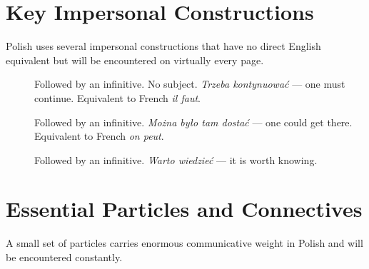 
\section{Key Impersonal Constructions}

Polish uses several impersonal constructions that have no direct English 
equivalent but will be encountered on virtually every page.

\begin{description}
  \item[] Followed by an 
    infinitive. No subject. \textit{Trzeba kontynuować} — one must continue. 
    Equivalent to French \textit{il faut}.
  \item[] Followed by an 
    infinitive. \textit{Można było tam dostać} — one could get there. 
    Equivalent to French \textit{on peut}.
  \item[] Followed by an infinitive. 
    \textit{Warto wiedzieć} — it is worth knowing.
\end{description}

\section{Essential Particles and Connectives}

A small set of particles carries enormous communicative weight in Polish 
and will be encountered constantly.


